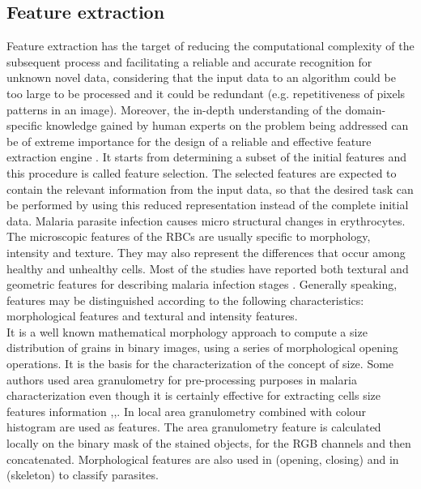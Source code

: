 \documentclass[sensors,review,submit,moreauthors,pdftex,10pt,a4paper]{mdpi}
\begin{document}
\subsection{Feature extraction}
Feature extraction has the target of reducing the computational complexity of the subsequent process and facilitating a reliable and accurate recognition for unknown novel data, considering that the input data to an algorithm could be too large to be processed and it could be redundant (e.g. repetitiveness of pixels patterns in an image). Moreover, the in-depth understanding of the domain-specific knowledge gained by human experts on the problem being addressed can be of extreme importance for the design of a reliable and effective feature extraction engine \cite{Jiang2009}.
It starts from determining a subset of the initial features and this procedure is called feature selection. The selected features are expected to contain the relevant information from the input data, so that the desired task can be performed by using this reduced representation instead of the complete initial data.
Malaria parasite infection causes micro structural changes in erythrocytes. The microscopic features of the RBCs are usually specific to morphology, intensity and texture. They may also represent the differences that occur among healthy and unhealthy cells. Most of the studies have reported both textural and geometric features for describing malaria infection stages \cite{Das2015}.
Generally speaking, features may be distinguished according to the following characteristics: morphological features and textural and intensity features.\\
It is a well known mathematical morphology approach to compute a size distribution of grains in binary images, using a series of morphological opening operations. It is the basis for the characterization of the concept of size. Some authors used area granulometry for pre-processing purposes in malaria characterization \cite{Tek2010} even though it is certainly effective for extracting cells size features information \cite{Tek2006},\cite{Malihi2013},\cite{Springl2009}. In \cite{Tek2010} local area granulometry combined with colour histogram are used as features. The area granulometry feature is calculated locally on the binary mask of the stained objects, for the RGB channels and then concatenated. Morphological features are also used
in \cite{Das2011} (opening, closing) and in \cite{DiRuberto2002} (skeleton) to classify parasites.

%
\end{document}

